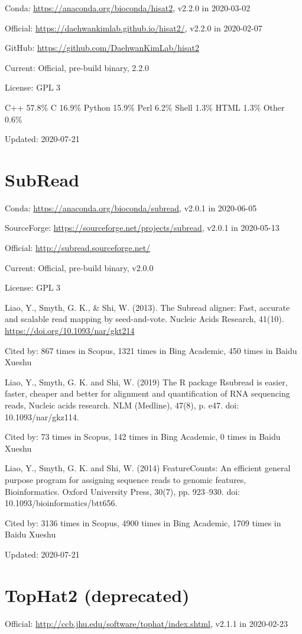 \documentclass[]{article}
\newcommand{\cb}[3]{\par Cited by: {\color{blue}\Huge #1} times in Scopus, {\color{blue}\Huge #2} times in Bing Academic, {\color{blue}\Huge #3} times in Baidu Xueshu}
\begin{document}
Conda: \url{https://anaconda.org/bioconda/hisat2}, v2.2.0 in 2020-03-02

Official: \url{https://daehwankimlab.github.io/hisat2/}, v2.2.0 in 2020-02-07

GitHub: \url{https://github.com/DaehwanKimLab/hisat2}

Current: Official, pre-build binary, 2.2.0

License: GPL 3

C++ 57.8\% C 16.9\% Python 15.9\% Perl 6.2\% Shell 1.3\% HTML 1.3\% Other 0.6\%

Updated: 2020-07-21

\section{SubRead}

Conda: \url{https://anaconda.org/bioconda/subread}, v2.0.1 in 2020-06-05

SourceForge: \url{https://sourceforge.net/projects/subread}, v2.0.1 in 2020-05-13

Official: \url{http://subread.sourceforge.net/}

Current: Official, pre-build binary, v2.0.0

License: GPL 3

Liao, Y., Smyth, G. K., \& Shi, W. (2013). The Subread aligner: Fast, accurate and scalable read mapping by seed-and-vote. Nucleic Acids Research, 41(10). \url{https://doi.org/10.1093/nar/gkt214}\cb{867}{1321}{450}

Liao, Y., Smyth, G. K. and Shi, W. (2019) The R package Rsubread is easier, faster, cheaper and better for alignment and quantification of RNA sequencing reads, Nucleic acids research. NLM (Medline), 47(8), p. e47. doi: 10.1093/nar/gkz114.\cb{73}{142}{0}

Liao, Y., Smyth, G. K. and Shi, W. (2014) FeatureCounts: An efficient general purpose program for assigning sequence reads to genomic features, Bioinformatics. Oxford University Press, 30(7), pp. 923–930. doi: 10.1093/bioinformatics/btt656.\cb{3136}{4900}{1709}

Updated: 2020-07-21

\section{TopHat2 (deprecated)}

Official: \url{http://ccb.jhu.edu/software/tophat/index.shtml}, v2.1.1 in 2020-02-23
\end{document}
